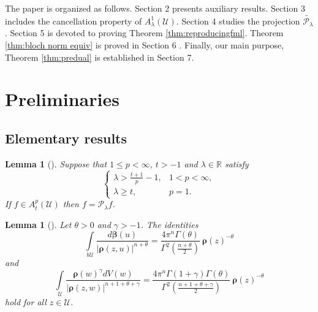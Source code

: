 \documentclass{amsart}
\newtheorem{lemma}[theorem]{Lemma}
\numberwithin{equation}{section}
\newcommand{\calU}{\mathcal{U}}
\newcommand{\bfbeta}{\boldsymbol{\beta}}
\newcommand{\bfrho}{\boldsymbol{\rho}}
\begin{document}
The paper is organized as follows. Section 2 presents auxiliary results. 
Section 3  includes the cancellation property of $A_{\lambda}^1(\calU)$.
Section 4 studies the projection $\widetilde{\mathcal{P}_{\lambda}}$. 
Section 5 is devoted to proving Theorem \ref{thm:reproducingfml}.
Theorem \ref{thm:bloch norm equiv} is proved in Section 6 .
Finally, our main purpose, Theorem \ref{thm:predual} is established in Section 7.




\section{Preliminaries}


\subsection{Elementary results}

\begin{lemma}[{\cite[Theorem 2.1]{DK93}}]\label{thm:DK}
Suppose that $1\leq p < \infty$, $t>-1$ and $\lambda\in \mathbb{R}$ satisfy
\[
\begin{cases}
\lambda > \frac {t+1}{p}-1,& 1<p<\infty,\\
\lambda \geq t,& p=1.
\end{cases}
\]
If $f\in A_{t}^p(\calU)$ then $f=\mathcal{P}_{\lambda} f$.
\end{lemma}

\begin{lemma}[{\cite[Lemma 13]{Liu18}}]
Let $\theta>0$ and $\gamma>-1$. The identities
\begin{equation}\label{eqn:keylem1}
\int\limits_{b\calU} \frac {d\bfbeta(u)} {|\bfrho(z,u)|^{n+\theta}} =
\frac {4\pi^{n} \Gamma(\theta)} {\Gamma^2\left(\frac {n+\theta}{2}\right)}\ \bfrho(z)^{-\theta}
\end{equation}
and
\begin{equation}\label{eqn:keylem}
\int\limits_{\calU} \frac {\bfrho(w)^{\gamma} dV(w)} {|\bfrho(z,w)|^{n+1+\theta+\gamma}}  =
\frac {4 \pi^{n} \Gamma(1+\gamma) \Gamma(\theta)} {\Gamma^2\left(\frac {n+1+\theta+\gamma}{2}\right)}\ \bfrho(z)^{-\theta}
\end{equation}
hold for all $z\in \calU$.
\end{lemma}
\end{document}
